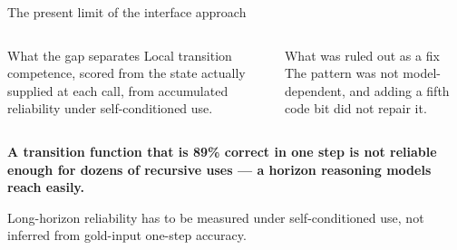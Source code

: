 \documentclass[aspectratio=169,10pt]{beamer}
\begin{document}
\begin{frame}{The present limit of the interface approach}
\begin{columns}[T,onlytextwidth]
\begin{block}{What the gap separates}
\small Local transition competence, scored from the state actually supplied at each call, from accumulated reliability under self-conditioned use.
\end{block}
\begin{block}{What was ruled out as a fix}
\small The pattern was not model-dependent, and adding a fifth code bit did not repair it.
\end{block}
\end{columns}
\vfill
\begin{center}\begin{minipage}{0.92\textwidth}\centering\bfseries
A transition function that is 89\% correct in one step is not reliable enough for dozens of recursive uses --- a horizon reasoning models reach easily.
\end{minipage}\end{center}
\vspace{0.2cm}
\begin{center}\small Long-horizon reliability has to be measured under self-conditioned use, not inferred from gold-input one-step accuracy.\end{center}
\end{frame}
\end{document}
